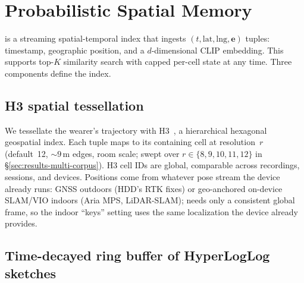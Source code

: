 
\section{Probabilistic Spatial Memory}

\label{sec:method}

\psm{} is a streaming spatial-temporal index that ingests
$(t, \mathrm{lat}, \mathrm{lng}, \mathbf{e})$ tuples: timestamp,
geographic position, and a $d$-dimensional CLIP embedding. This supports
top-$K$ similarity search with capped per-cell state at any time. Three
components define the index.



\subsection{H3 spatial tessellation}
\label{sec:method-h3}

We tessellate the wearer's trajectory with H3~\cite{brodsky2018h3}, a
hierarchical hexagonal geospatial index. Each tuple maps to its containing cell
at resolution~$r$ (default~12, ${\sim}9$\,m edges, room scale; swept over
$r\in\{8,9,10,11,12\}$ in \S\ref{sec:results-multi-corpus}). H3 cell IDs are
global, comparable across recordings, sessions, and devices.
Positions come from whatever pose stream the device already runs: GNSS outdoors
(HDD's RTK fixes) or geo-anchored on-device SLAM/VIO indoors (Aria MPS,
LiDAR-SLAM); \psm{} needs only a consistent global frame, so the indoor ``keys''
setting uses the same localization the device already provides.

\subsection{Time-decayed ring buffer of HyperLogLog sketches}
\label{sec:method-ring-buffer}

